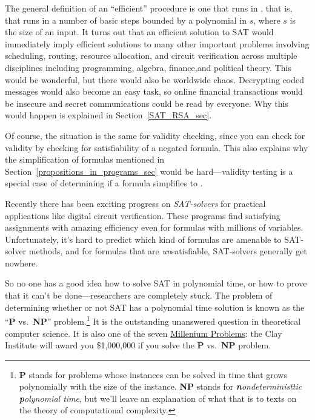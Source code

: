 The general definition of an ``efficient'' procedure is one that runs
in , that is, that runs in a number of basic
steps bounded by a polynomial in $s$, where $s$ is the size of an
input.  It turns out that an efficient solution to SAT would
immediately imply efficient solutions to many other important problems
involving scheduling, routing, resource allocation, and circuit
verification across multiple disciplines including programming,
algebra, finance,and political theory.  This would
be wonderful, but there would also be worldwide chaos.  Decrypting
coded messages would also become an easy task, so online financial
transactions would be insecure and secret communications could be read
by everyone.  Why this would happen is explained in
Section~\ref{SAT_RSA_sec}.

Of course, the situation is the same for validity%
checking, since you can check for validity by checking
 for satisfiability of a negated
formula.  This also explains why the simplification of formulas
mentioned in Section~\ref{propositions_in_programs_sec} would be
hard---validity testing is a special case of determining if a formula
simplifies to \true.

Recently there has been exciting progress on \emph{SAT-solvers}%
for practical applications like digital circuit verification.  These
programs find satisfying assignments with amazing efficiency even for
formulas with millions of variables.  Unfortunately, it's hard to
predict which kind of formulas are amenable to SAT-solver methods, and
for formulas that are \emph{un}satisfiable, SAT-solvers generally get
nowhere.

So no one has a good idea how to solve SAT in polynomial time, or how
to prove that it can't be done---researchers are completely stuck.
The problem of determining whether or not SAT has a polynomial time
solution is known as the ``\textbf{P} vs.\ \textbf{NP}''%
problem.\footnote{\textbf{P} stands for problems whose instances can
  be solved in time that grows polynomially with the size of the
  instance.  \textbf{NP} stands for \emph{\textbf{n}ondeterministtic \textbf{p}olynomial time},
  but we'll leave an explanation of what that is to texts on the
  theory of computational complexity.}  It is the outstanding
unanswered question in theoretical computer science.  It is also one
of the seven \href{http://www.claymath.org/millennium/}{Millenium
  Problems}: the Clay Institute will award you \$1,000,000 if you
solve the \textbf{P} vs.\ \textbf{NP} problem.

